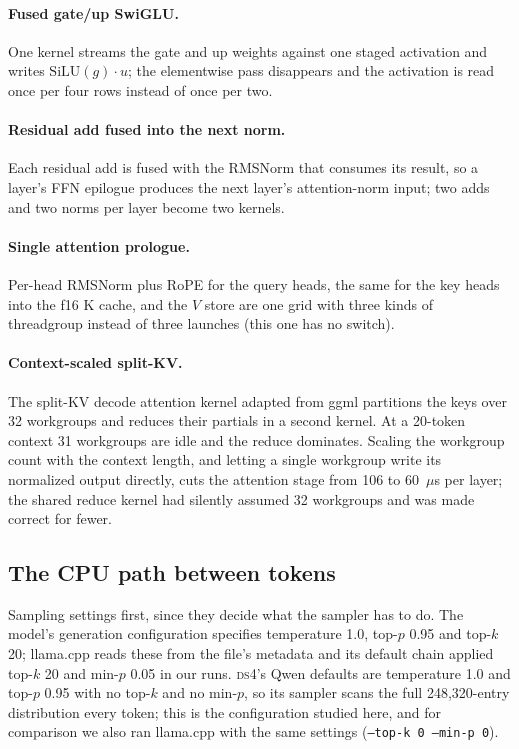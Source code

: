 \documentclass[11pt]{article}
\newcommand{\ds}{\textsc{ds4}}
\begin{document}
\paragraph{Fused gate/up SwiGLU.} One kernel streams the gate and up weights
against one staged activation and writes $\mathrm{SiLU}(g)\cdot u$; the
elementwise pass disappears and the activation is read once per four rows
instead of once per two.
\paragraph{Residual add fused into the next norm.} Each residual add is fused
with the RMSNorm that consumes its result, so a layer's FFN epilogue produces
the next layer's attention-norm input; two adds and two norms per layer become
two kernels.
\paragraph{Single attention prologue.} Per-head RMSNorm plus RoPE for the
query heads, the same for the key heads into the f16 K cache, and the $V$
store are one grid with three kinds of threadgroup instead of three launches
(this one has no switch).
\paragraph{Context-scaled split-KV.} The split-KV decode attention kernel
adapted from ggml partitions the keys over 32 workgroups and reduces their
partials in a second kernel. At a 20-token context 31 workgroups are idle and
the reduce dominates. Scaling the workgroup count with the context length,
and letting a single workgroup write its normalized output directly, cuts the
attention stage from 106 to 60~$\mu$s per layer; the shared reduce kernel had
silently assumed 32 workgroups and was made correct for fewer.

\subsection{The CPU path between tokens}
\label{sec:cpu}
Sampling settings first, since they decide what the sampler has to do. The
model's generation configuration specifies temperature 1.0, top-$p$ 0.95 and
top-$k$ 20; llama.cpp reads these from the file's metadata and its default
chain applied top-$k$ 20 and min-$p$ 0.05 in our runs. \ds{}'s Qwen defaults
are temperature 1.0 and top-$p$ 0.95 with no top-$k$ and no min-$p$, so its
sampler scans the full 248,320-entry distribution every token; this is the
configuration studied here, and for comparison we also ran llama.cpp with
the same settings (\texttt{--top-k 0 --min-p 0}).
\end{document}
